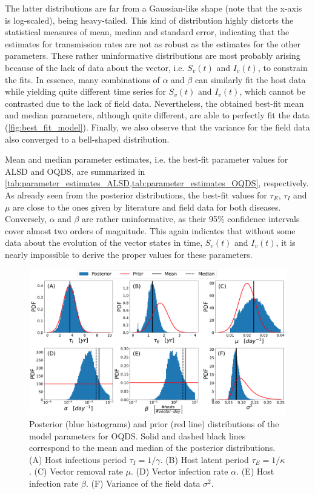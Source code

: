 The latter distributions are far from a Gaussian-like shape (note that the
x-axis is log-scaled), being heavy-tailed. This kind of distribution highly
distorts the statistical measures of mean, median and standard error,
indicating that the estimates for transmission rates are not as robust as the
estimates for the other parameters. These rather uninformative distributions
are most probably arising because of the lack of data about the vector, i.e.
$S_v(t)$ and $I_v(t)$, to constrain the fits. In essence, many combinations of
$\alpha$ and $\beta$ can similarly fit the host data while yielding quite
different time series for $S_v(t)$ and $I_v(t)$, which cannot be contrasted due
to the lack of field data. Nevertheless, the obtained best-fit mean and median
parameters, although quite different, are able to perfectly fit the data
(\cref{fig:best_fit_model}). Finally, we also observe that the variance for the
field data also converged to a bell-shaped distribution.

Mean and median parameter estimates, i.e. the best-fit parameter values for
ALSD and OQDS, are summarized in
\cref{tab:parameter_estimates_ALSD,tab:parameter_estimates_OQDS}, respectively.
As already seen from the posterior distributions, the best-fit values for
$\tau_E$, $\tau_I$ and $\mu$ are close to the ones given by literature and
field data for both diseases. Conversely, $\alpha$ and $\beta$ are rather
uninformative, as their 95\% confidence intervals cover almost two orders of
magnitude. This again indicates that without some data about the evolution of
the vector states in time, $S_v(t)$ and $I_v(t)$, it is nearly impossible to
derive the proper values for these parameters.

\begin{figure}[H]
    \centering

    \includegraphics[width=\textwidth]{Figures/Parameter_estimates_OQDS.pdf}
    \caption{Posterior (blue histograms) and prior (red line) distributions
        of the model parameters for OQDS. Solid and dashed black lines
        correspond to
        the mean and median of the posterior distributions. (A) Host infectious
        period
        $\tau_I=1/\gamma$. (B) Host latent period $\tau_E=1/\kappa$. (C) Vector
        removal
        rate $\mu$. (D) Vector infection rate $\alpha$. (E) Host infection rate
        $\beta$. (F) Variance of the field data $\sigma^2$.}
    \label{fig:parameter_estimates_OQDS}
\end{figure}

